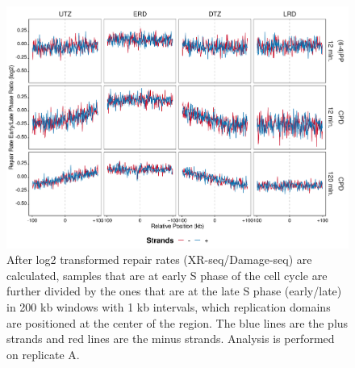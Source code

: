 \begin{figure}[H]
\begin{center}
\includegraphics[width=\textwidth]{Chapters/7_appendix/figures/supfig26}
\caption[Repair rate early/late phase ratio of replication domains in 200 kb (replicate A).]{After log2 transformed repair rates (XR-seq/Damage-seq) are calculated, samples that are at early S phase of the cell cycle are further divided by the ones that are at the late S phase (early/late) in 200 kb windows with 1 kb intervals, which replication domains are positioned at the center of the region. The blue lines are the plus strands and red lines are the minus strands. Analysis is performed on replicate A.}
\label{supfig:rrel200repdomainA}
\end{center}
\end{figure}


